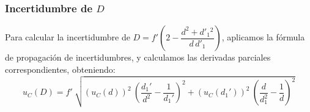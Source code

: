 \documentclass[10pt,onecolumn]{article}
\begin{document}
\subsubsection{Incertidumbre de $D$}
Para calcular la incertidumbre de $D = f' \left( 2 - \dfrac{d^{2} + d'_{1}{}^{2}}{d\, d'_{1}} \right)$, aplicamos la fórmula de propagación de incertidumbres, y calculamos las derivadas parciales correspondientes, obteniendo:
\begin{equation}
    \boxed{u_C(D)= f'\ \sqrt{(u_C(d))^2\ (\dfrac{d_1'}{d^2} - \dfrac{1}{d_1'})^2 + (u_C(d_1'))^2\ (\dfrac{d}{d_1^2} - \dfrac{1}{d})^2}}
\end{equation}

\end{document}
